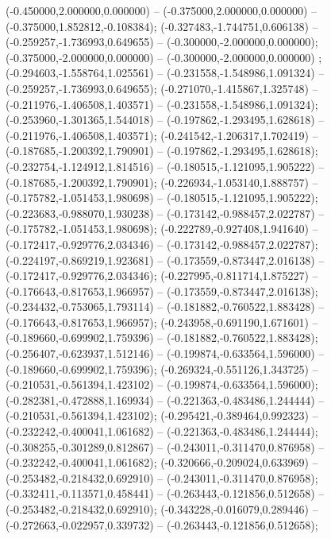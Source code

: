 (-0.450000,2.000000,0.000000) -- (-0.375000,2.000000,0.000000) -- (-0.375000,1.852812,-0.108384);
 (-0.327483,-1.744751,0.606138) -- (-0.259257,-1.736993,0.649655) -- (-0.300000,-2.000000,0.000000);
 (-0.375000,-2.000000,0.000000) -- (-0.300000,-2.000000,0.000000) ;
 (-0.294603,-1.558764,1.025561) -- (-0.231558,-1.548986,1.091324) -- (-0.259257,-1.736993,0.649655);
 (-0.271070,-1.415867,1.325748) -- (-0.211976,-1.406508,1.403571) -- (-0.231558,-1.548986,1.091324);
 (-0.253960,-1.301365,1.544018) -- (-0.197862,-1.293495,1.628618) -- (-0.211976,-1.406508,1.403571);
 (-0.241542,-1.206317,1.702419) -- (-0.187685,-1.200392,1.790901) -- (-0.197862,-1.293495,1.628618);
 (-0.232754,-1.124912,1.814516) -- (-0.180515,-1.121095,1.905222) -- (-0.187685,-1.200392,1.790901);
 (-0.226934,-1.053140,1.888757) -- (-0.175782,-1.051453,1.980698) -- (-0.180515,-1.121095,1.905222);
 (-0.223683,-0.988070,1.930238) -- (-0.173142,-0.988457,2.022787) -- (-0.175782,-1.051453,1.980698);
 (-0.222789,-0.927408,1.941640) -- (-0.172417,-0.929776,2.034346) -- (-0.173142,-0.988457,2.022787);
 (-0.224197,-0.869219,1.923681) -- (-0.173559,-0.873447,2.016138) -- (-0.172417,-0.929776,2.034346);
 (-0.227995,-0.811714,1.875227) -- (-0.176643,-0.817653,1.966957) -- (-0.173559,-0.873447,2.016138);
 (-0.234432,-0.753065,1.793114) -- (-0.181882,-0.760522,1.883428) -- (-0.176643,-0.817653,1.966957);
 (-0.243958,-0.691190,1.671601) -- (-0.189660,-0.699902,1.759396) -- (-0.181882,-0.760522,1.883428);
 (-0.256407,-0.623937,1.512146) -- (-0.199874,-0.633564,1.596000) -- (-0.189660,-0.699902,1.759396);
 (-0.269324,-0.551126,1.343725) -- (-0.210531,-0.561394,1.423102) -- (-0.199874,-0.633564,1.596000);
 (-0.282381,-0.472888,1.169934) -- (-0.221363,-0.483486,1.244444) -- (-0.210531,-0.561394,1.423102);
 (-0.295421,-0.389464,0.992323) -- (-0.232242,-0.400041,1.061682) -- (-0.221363,-0.483486,1.244444);
 (-0.308255,-0.301289,0.812867) -- (-0.243011,-0.311470,0.876958) -- (-0.232242,-0.400041,1.061682);
 (-0.320666,-0.209024,0.633969) -- (-0.253482,-0.218432,0.692910) -- (-0.243011,-0.311470,0.876958);
 (-0.332411,-0.113571,0.458441) -- (-0.263443,-0.121856,0.512658) -- (-0.253482,-0.218432,0.692910);
 (-0.343228,-0.016079,0.289446) -- (-0.272663,-0.022957,0.339732) -- (-0.263443,-0.121856,0.512658);
